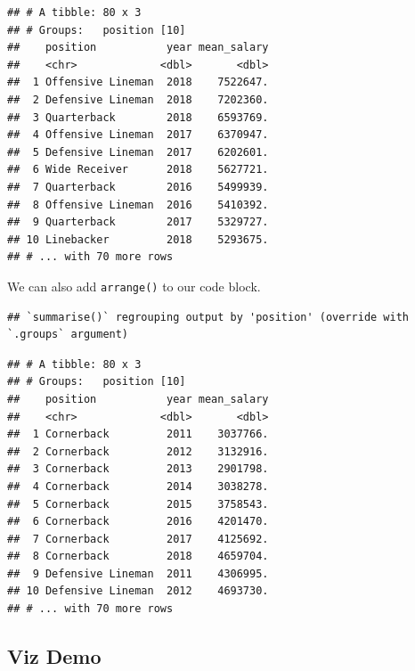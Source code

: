 \documentclass[
]{book}
\newenvironment{Shaded}{\begin{snugshade}}{\end{snugshade}}
\newcommand{\DataTypeTok}[1]{\textcolor[rgb]{0.13,0.29,0.53}{#1}}
\newcommand{\KeywordTok}[1]{\textcolor[rgb]{0.13,0.29,0.53}{\textbf{#1}}}
\newcommand{\NormalTok}[1]{#1}
\newcommand{\OperatorTok}[1]{\textcolor[rgb]{0.81,0.36,0.00}{\textbf{#1}}}
\newcommand{\StringTok}[1]{\textcolor[rgb]{0.31,0.60,0.02}{#1}}
\begin{document}
\begin{verbatim}
## # A tibble: 80 x 3
## # Groups:   position [10]
##    position           year mean_salary
##    <chr>             <dbl>       <dbl>
##  1 Offensive Lineman  2018    7522647.
##  2 Defensive Lineman  2018    7202360.
##  3 Quarterback        2018    6593769.
##  4 Offensive Lineman  2017    6370947.
##  5 Defensive Lineman  2017    6202601.
##  6 Wide Receiver      2018    5627721.
##  7 Quarterback        2016    5499939.
##  8 Offensive Lineman  2016    5410392.
##  9 Quarterback        2017    5329727.
## 10 Linebacker         2018    5293675.
## # ... with 70 more rows
\end{verbatim}

We can also add \texttt{arrange()} to our code block.

\begin{Shaded}
\end{Shaded}

\begin{verbatim}
## `summarise()` regrouping output by 'position' (override with `.groups` argument)
\end{verbatim}

\begin{verbatim}
## # A tibble: 80 x 3
## # Groups:   position [10]
##    position           year mean_salary
##    <chr>             <dbl>       <dbl>
##  1 Cornerback         2011    3037766.
##  2 Cornerback         2012    3132916.
##  3 Cornerback         2013    2901798.
##  4 Cornerback         2014    3038278.
##  5 Cornerback         2015    3758543.
##  6 Cornerback         2016    4201470.
##  7 Cornerback         2017    4125692.
##  8 Cornerback         2018    4659704.
##  9 Defensive Lineman  2011    4306995.
## 10 Defensive Lineman  2012    4693730.
## # ... with 70 more rows
\end{verbatim}

\hypertarget{viz-demo}{%
\subsection{Viz Demo}\label{viz-demo}}
\end{document}
